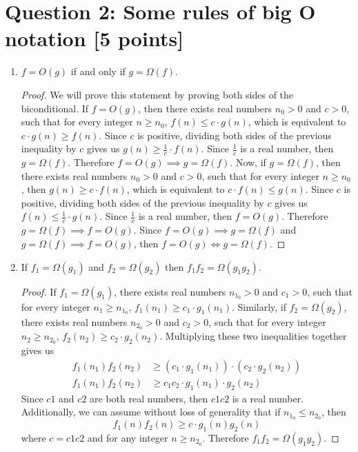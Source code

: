 \documentclass{report}
\theoremstyle{mytheoremstyle}
\theoremstyle{mytheoremstyle}
\theoremstyle{myproblemstyle}
\begin{document}
\section*{Question 2: Some rules of big O notation [5 points]}
\begin{enumerate}
    \item $f=O(g)$ if and only if $g=\Omega(f)$.
        \begin{proof}
            We will prove this statement by proving both sides of the biconditional. If $f = O(g)$, then there exists real numbers $n_0 > 0$ and $c > 0$, such that for every integer $n \geq n_0$, $f(n) \leq c\cdot g(n)$, which is equivalent to $c\cdot g(n) \geq f(n)$. Since $c$ is positive, dividing both sides of the previous inequality by $c$ gives us $g(n) \geq \frac{1}{c}\cdot f(n)$. Since $\frac{1}{c}$ is a real number, then $g = \Omega(f).$ Therefore $f = O(g) \implies g = \Omega(f)$. Now, if $g = \Omega(f)$, then there exists real numbers $n_0 > 0$ and $c > 0$, such that for every integer $n \geq n _0$, then $g(n) \geq c\cdot f(n)$, which is equivalent to $c\cdot f(n) \leq g(n)$. Since $c$ is positive, dividing both sides of the previous inequality by $c$ gives us $f(n) \leq \frac{1}{c}\cdot g(n)$. Since $\frac{1}{c}$ is a real number, then $f = O(g)$. Therefore $g=\Omega(f)\implies f=O(g)$. Since $f=O(g)\implies g=\Omega(f)$ and $g=\Omega(f)\implies f=O(g)$, then $f=O(g)\iff g=\Omega(f)$.
        \end{proof}
    \item If $f_1=\Omega(g_1)$ and $f_2=\Omega(g_2)$ then $f_1f_2=\Omega(g_1g_2)$.
        \begin{proof}
            If $f_1=\Omega(g_1)$, there exists real numbers $n_{1_0} > 0$ and $c_1 > 0$, such that for every integer $n_1 \geq n_{1_0}$, $f_1(n_1)\geq c_1\cdot g_1(n_1)$. Similarly, if $f_2=\Omega(g_2)$, there exists real numbers $n_{2_0} > 0$ and $c_2 > 0$, such that for every integer $n_2 \geq n_{2_0}$, $f_2(n_2)\geq c_2\cdot g_2(n_2)$. Multiplying these two inequalities together gives us 
            \begin{align}
                f_1(n_1)f_2(n_2)&\geq (c_1\cdot g_1(n_1))\cdot(c_2\cdot g_2(n_2)) \\
                f_1(n_1)f_2(n_2)&\geq c_1c_2\cdot g_1(n_1)\cdot g_2(n_2)
            \end{align}
        Since $c1$ and $c2$ are both real numbers, then $c1c2$ is a real number. Additionally, we can assume without loss of generality that if $n_{1_0} \leq n_{2_0}$, then $$f_1(n)f_2(n) \geq c\cdot g_1(n)g_2(n)$$ where $c=c1c2$ and for any integer $n\geq n_{2_0}$. Therefore $f_1f_2 = \Omega(g_1g_2)$.

\end{proof}
\end{enumerate}
\end{document}
